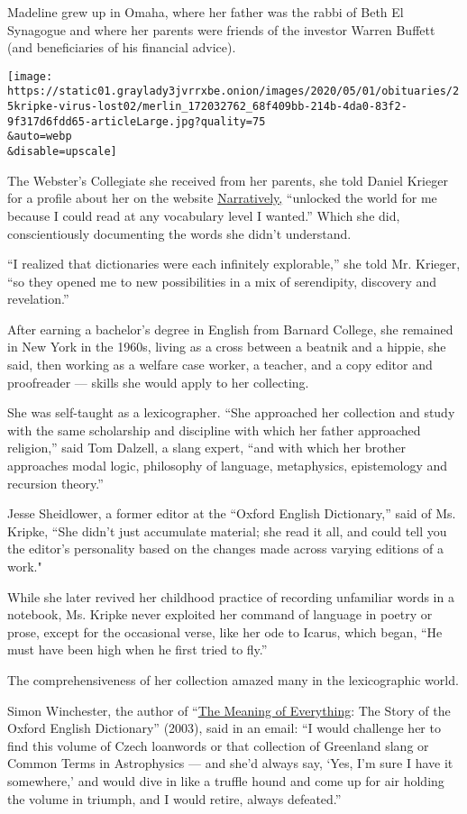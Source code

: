 Madeline grew up in Omaha, where her father was the rabbi of Beth El
Synagogue and where her parents were friends of the investor Warren
Buffett (and beneficiaries of his financial advice).

\texttt{[image: https://static01.graylady3jvrrxbe.onion/images/2020/05/01/obituaries/25kripke-virus-lost02/merlin\_172032762\_68f409bb-214b-4da0-83f2-9f317d6fdd65-articleLarge.jpg?quality=75\\\&auto=webp\\\&disable=upscale]}

The Webster's Collegiate she received from her parents, she told Daniel
Krieger for a profile about her on the website
\href{https://narratively.com/the-dame-of-dictionaries/}{Narratively,}
``unlocked the world for me because I could read at any vocabulary level
I wanted.'' Which she did, conscientiously documenting the words she
didn't understand.

``I realized that dictionaries were each infinitely explorable,'' she
told Mr. Krieger, ``so they opened me to new possibilities in a mix of
serendipity, discovery and revelation.''

After earning a bachelor's degree in English from Barnard College, she
remained in New York in the 1960s, living as a cross between a beatnik
and a hippie, she said, then working as a welfare case worker, a
teacher, and a copy editor and proofreader --- skills she would apply to
her collecting.

She was self-taught as a lexicographer. ``She approached her collection
and study with the same scholarship and discipline with which her father
approached religion,'' said Tom Dalzell, a slang expert, ``and with
which her brother approaches modal logic, philosophy of language,
metaphysics, epistemology and recursion theory.''

Jesse Sheidlower, a former editor at the ``Oxford English Dictionary,''
said of Ms. Kripke, ``She didn't just accumulate material; she read it
all, and could tell you the editor's personality based on the changes
made across varying editions of a work."

While she later revived her childhood practice of recording unfamiliar
words in a notebook, Ms. Kripke never exploited her command of language
in poetry or prose, except for the occasional verse, like her ode to
Icarus, which began, ``He must have been high when he first tried to
fly.''

The comprehensiveness of her collection amazed many in the lexicographic
world.

Simon Winchester, the author of
``\href{https://www.nytimes3xbfgragh.onion/2003/10/12/books/you-could-look-it-up.html}{The
Meaning of Everything}: The Story of the Oxford English Dictionary''
(2003), said in an email: ``I would challenge her to find this volume of
Czech loanwords or that collection of Greenland slang or Common Terms in
Astrophysics --- and she'd always say, `Yes, I'm sure I have it
somewhere,' and would dive in like a truffle hound and come up for air
holding the volume in triumph, and I would retire, always defeated.''

